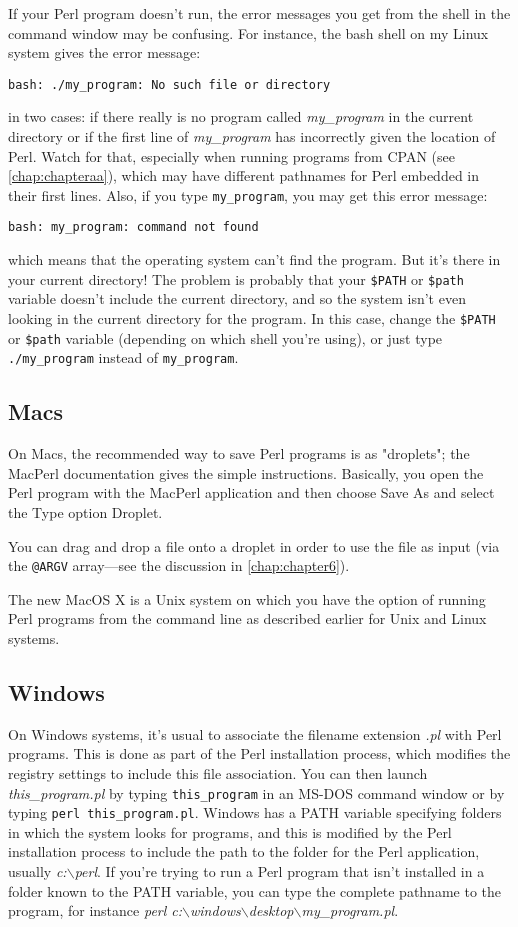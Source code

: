If your Perl program doesn't run, the error messages you get from the shell in the command window may be confusing. For instance, the bash shell on my Linux system gives the error message:

\verb|bash: ./my_program: No such file or directory|

in two cases: if there really is no program called \textit{my\_program} in the current directory or if the first line of \textit{my\_program} has incorrectly given the location of Perl. Watch for that, especially when running programs from CPAN (see \ref{chap:chapteraa}), which may have different pathnames for Perl embedded in their first lines. Also, if you type \verb|my_program|, you may get this error message:

\verb|bash: my_program: command not found|

which means that the operating system can't find the program. But it's
there in your current directory! The problem is probably that your
\verb|$PATH| or \verb|$path| variable doesn't include the current
directory, and so the system isn't even looking in the current directory
for the program. In this case, change the \verb|$PATH| or \verb|$path|
variable (depending on which shell you're using), or just type \verb|./my_program| instead of \verb|my_program|.  

\subsection{Macs}
On Macs, the recommended way to save Perl programs is as "droplets"; the MacPerl documentation gives the simple instructions. Basically, you open the Perl program with the MacPerl application and then choose Save As and select the Type option Droplet.

You can drag and drop a file onto a droplet in order to use the file as input (via the \verb|@ARGV| array—see the discussion in \ref{chap:chapter6}).

The new MacOS X is a Unix system on which you have the option of running Perl programs from the command line as described earlier for Unix and Linux systems.

\subsection{Windows}
On Windows systems, it's usual to associate the filename extension \textit{.pl} with Perl programs. This is done as part of the Perl installation process, which modifies the registry settings to include this file association. You can then launch \textit{this\_program.pl} by typing \verb|this_program| in an MS-DOS command window or by typing \verb|perl this_program.pl|. Windows has a PATH variable specifying folders in which the system looks for programs, and this is modified by the Perl installation process to include the path to the folder for the Perl application, usually \textit{c:$\backslash$perl}. If you're trying to run a Perl program that isn't installed in a folder known to the PATH variable, you can type the complete pathname to the program, for instance \textit{perl c:$\backslash$windows$\backslash$desktop$\backslash$my\_program.pl}.

